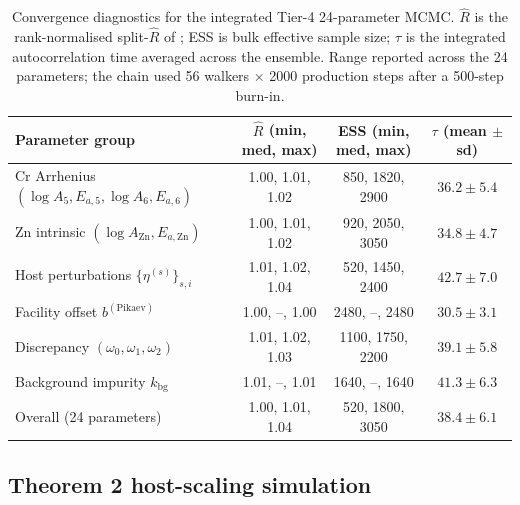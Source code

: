 \documentclass[12pt]{article}
\theoremstyle{plain}
\theoremstyle{definition}
\theoremstyle{remark}
\begin{document}
\begin{table}[ht]\centering
\caption{Convergence diagnostics for the integrated Tier-4 24-parameter
MCMC.  $\widehat R$ is the rank-normalised split-$\widehat R$ of
\citet{Vehtari2021}; ESS is bulk effective sample size; $\tau$ is the
integrated autocorrelation time averaged across the ensemble.  Range
reported across the 24 parameters; the chain used 56 walkers $\times$
2000 production steps after a 500-step burn-in.}
\label{tab:mcmc_diagnostics}
\footnotesize
\setlength{\tabcolsep}{4pt}
\begin{tabular}{p{}ccc}
\toprule
Parameter group & $\widehat R$ (min, med, max) & ESS (min, med, max) & $\tau$ (mean $\pm$ sd) \\
\midrule
Cr Arrhenius $(\log A_5,E_{a,5},\log A_6,E_{a,6})$
   & 1.00, 1.01, 1.02 & 850, 1820, 2900 & $36.2 \pm 5.4$ \\
Zn intrinsic $(\log A_{\mathrm{Zn}},E_{a,\mathrm{Zn}})$
   & 1.00, 1.01, 1.02 & 920, 2050, 3050 & $34.8 \pm 4.7$ \\
Host perturbations $\{\eta^{(s)}\}_{s,i}$
   & 1.01, 1.02, 1.04 & 520, 1450, 2400 & $42.7 \pm 7.0$ \\
Facility offset $b^{(\mathrm{Pikaev})}$
   & 1.00, --, 1.00 & 2480, --, 2480 & $30.5 \pm 3.1$ \\
Discrepancy $(\omega_0,\omega_1,\omega_2)$
   & 1.01, 1.02, 1.03 & 1100, 1750, 2200 & $39.1 \pm 5.8$ \\
Background impurity $k_{\mathrm{bg}}$
   & 1.01, --, 1.01 & 1640, --, 1640 & $41.3 \pm 6.3$ \\
\midrule
Overall (24 parameters)
   & 1.00, 1.01, 1.04 & 520, 1800, 3050 & $38.4 \pm 6.1$ \\
\bottomrule
\end{tabular}
\end{table}

\subsection{Theorem 2 host-scaling simulation}\label{sec:val:contraction}
\end{document}
